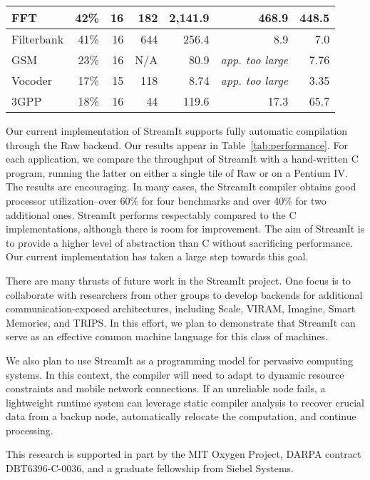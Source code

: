 \begin{table*}[t]
\begin{center}
\begin{tabular}{|l||r|r|r|r||r||r||}
FFT    & 42\% & 16  & 182 &  2,141.9 & 468.9 & 448.5  \\ \hline
Filterbank & 
       41\% & 16  &  644 &   256.4  & 8.9 & 7.0   \\ \hline
GSM    & 23\% & 16 & N/A &    80.9  & {\it app. too large} & 7.76 \\ \hline
Vocoder& 17\% & 15  & 118 &     8.74  & {\it app. too large} & 3.35  \\ \hline
3GPP   & 18\% & 16  & 44 &   119.6  & 17.3  & 65.7   \\ \hline \hline
\end{tabular}
\vspace{-6pt}
\caption{\protect\small Performance Results.}
\label{tab:performance}
\end{center}
\vspace{-12pt}
\end{table*}

Our current implementation of StreamIt supports fully automatic
compilation through the Raw backend.  Our results appear in
Table~\ref{tab:performance}.
For each application, we compare the throughput of StreamIt with a
hand-written C program, running the latter on either a single tile of
Raw or on a Pentium IV.
The results are encouraging.  In many cases, the StreamIt compiler
obtains good processor utilization--over 60\% for four benchmarks and
over 40\% for two additional ones.
StreamIt performs respectably compared to the C implementations,
although there is room for improvement.  The aim of StreamIt is to
provide a higher level of abstraction than C without sacrificing
performance.  Our current implementation has taken a large step
towards this goal.

There are many thrusts of future work in the StreamIt project.  One
focus is to collaborate with researchers from other groups to develop
backends for additional communication-exposed architectures, including
Scale, VIRAM, Imagine, Smart Memories, and TRIPS.  In this effort, we
plan to demonstrate that StreamIt can serve as an effective common
machine language for this class of machines.

We also plan to use StreamIt as a programming model for pervasive
computing systems.  In this context, the compiler will need to adapt
to dynamic resource constraints and mobile network connections.  If an
unreliable node fails, a lightweight runtime system can leverage
static compiler analysis to recover crucial data from a backup node,
automatically relocate the computation, and continue processing.

This research is supported in part by the MIT Oxygen Project, DARPA
contract DBT6396-C-0036, and a graduate fellowship from Siebel Systems.

